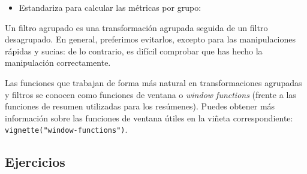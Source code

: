 \documentclass[11pt,oneside]{report}
\newenvironment{Shaded}{\begin{snugshade}}{\end{snugshade}}
\newcommand{\CommentTok}[1]{\textcolor[rgb]{0.56,0.35,0.01}{\textit{#1}}}
\newcommand{\DataTypeTok}[1]{\textcolor[rgb]{0.13,0.29,0.53}{#1}}
\newcommand{\DecValTok}[1]{\textcolor[rgb]{0.00,0.00,0.81}{#1}}
\newcommand{\KeywordTok}[1]{\textcolor[rgb]{0.13,0.29,0.53}{\textbf{#1}}}
\newcommand{\NormalTok}[1]{#1}
\newcommand{\OperatorTok}[1]{\textcolor[rgb]{0.81,0.36,0.00}{\textbf{#1}}}
\newcommand{\StringTok}[1]{\textcolor[rgb]{0.31,0.60,0.02}{#1}}
\providecommand{\tightlist}{%
  \setlength{\itemsep}{0pt}\setlength{\parskip}{0pt}}
\begin{document}
\begin{itemize}
\tightlist
\item
  Estandariza para calcular las métricas por grupo:
\end{itemize}

\begin{Shaded}
\end{Shaded}

Un filtro agrupado es una transformación agrupada seguida de un filtro
desagrupado. En general, preferimos evitarlos, excepto para las
manipulaciones rápidas y sucias: de lo contrario, es difícil comprobar
que has hecho la manipulación correctamente.

Las funciones que trabajan de forma más natural en transformaciones
agrupadas y filtros se conocen como funciones de ventana o \emph{window
functions} (frente a las funciones de resumen utilizadas para los
resúmenes). Puedes obtener más información sobre las funciones de
ventana útiles en la viñeta correspondiente:
\texttt{vignette("window-functions")}.

\hypertarget{ejercicios-13}{%
\subsection{Ejercicios}\label{ejercicios-13}}
\end{document}
